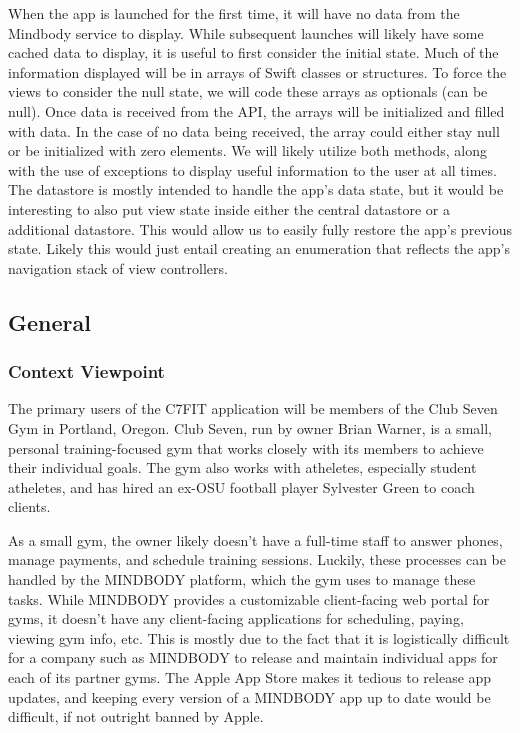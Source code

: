 \documentclass[letterpaper,10pt,titlepage]{article}
\begin{document}
When the app is launched for the first time, it will have no data from the Mindbody service to display. While subsequent launches will likely have some cached data to display, it is useful to first consider the initial state. Much of the information displayed will be in arrays of Swift classes or structures. To force the views to consider the null state, we will code these arrays as optionals (can be null). Once data is received from the API, the arrays will be initialized and filled with data. In the case of no data being received, the array could either stay null or be initialized with zero elements. We will likely utilize both methods, along with the use of exceptions to display useful information to the user at all times. \\

The datastore is mostly intended to handle the app's data state, but it would be interesting to also put view state inside either the central datastore or a additional datastore. This would allow us to easily fully restore the app's previous state. Likely this would just entail creating an enumeration that reflects the app's navigation stack of view controllers.

\subsection{General}

\subsubsection{Context Viewpoint}
The primary users of the C7FIT application will be members of the Club Seven Gym in Portland, Oregon. Club Seven, run by owner Brian Warner, is a small, personal training-focused gym that works closely with its members to achieve their individual goals. The gym also works with atheletes, especially student atheletes, and has hired an ex-OSU football player Sylvester Green to coach clients.

As a small gym, the owner likely doesn't have a full-time staff to answer phones, manage payments, and schedule training sessions. Luckily, these processes can be handled by the MINDBODY platform, which the gym uses to manage these tasks. While MINDBODY provides a customizable client-facing web portal for gyms, it doesn't have any client-facing applications for scheduling, paying, viewing gym info, etc. This is mostly due to the fact that it is logistically difficult for a company such as MINDBODY to release and maintain individual apps for each of its partner gyms. The Apple App Store makes it tedious to release app updates, and keeping every version of a MINDBODY app up to date would be difficult, if not outright banned by Apple.
\end{document}
